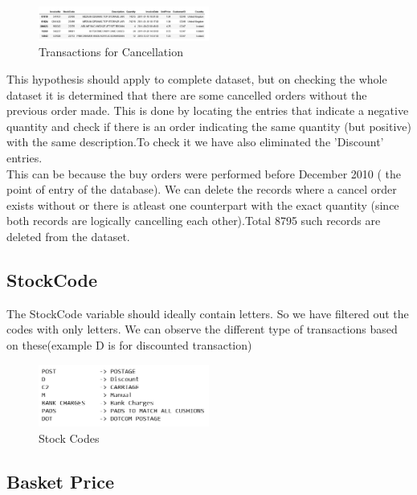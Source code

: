 \begin{figure}[h]
\caption{Transactions for Cancellation}
\label{2.3}
\centering
\includegraphics[width=0.5\textwidth]{images/2_3.PNG}
\end{figure}

This hypothesis should apply to complete dataset, but on checking the whole dataset it is determined that there are some cancelled orders without the previous order made. This is done by locating the entries that indicate a negative quantity and check if there is an order indicating the same quantity (but positive) with the same description.To check it we have also eliminated the 'Discount' entries.\\

This can be because the buy orders were performed before December 2010 ( the point of entry of the database). We can delete the records where a cancel order exists without or there is atleast one counterpart with the exact quantity (since both records are logically cancelling each other).Total 8795 such records are deleted from the dataset.\\

\subsection*{StockCode}

The StockCode variable should ideally contain letters. So we have filtered out the codes with only letters. We can observe the different type of transactions based on these(example D is for discounted transaction)\\

\begin{figure}[h]
\caption{Stock Codes}
\label{2.4}
\centering
\includegraphics[width=0.5\textwidth]{images/2_4.PNG}
\end{figure}

\subsection*{Basket Price}

